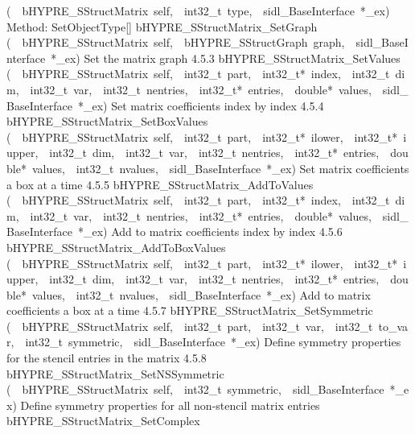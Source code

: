 \documentclass{article}
\begin{document}
\begin{cxxentry}
\begin{cxxentry}
\begin{cxxnames}
        {(\ \ bHYPRE\_SStructMatrix\ self,\ \ int32\_t\ type,\ \ sidl\_BaseInterface\ *\_ex)}
        {
Method:  SetObjectType[]}
        {}
\label{cxx.4.5.19}
        {bHYPRE\_SStructMatrix\_SetGraph}
        {(\ \ bHYPRE\_SStructMatrix\ self,\ \ bHYPRE\_SStructGraph\ graph,\ \ sidl\_BaseInterface\ *\_ex)}
        {
Set the matrix graph}
        {4.5.3}
        {bHYPRE\_SStructMatrix\_SetValues}
        {(\ \ bHYPRE\_SStructMatrix\ self,\ \ int32\_t\ part,\ \ int32\_t*\ index,\ \ int32\_t\ dim,\ \ int32\_t\ var,\ \ int32\_t\ nentries,\ \ int32\_t*\ entries,\ \ double*\ values,\ \ sidl\_BaseInterface\ *\_ex)}
        {
Set matrix coefficients index by index}
        {4.5.4}
        {bHYPRE\_SStructMatrix\_SetBoxValues}
        {(\ \ bHYPRE\_SStructMatrix\ self,\ \ int32\_t\ part,\ \ int32\_t*\ ilower,\ \ int32\_t*\ iupper,\ \ int32\_t\ dim,\ \ int32\_t\ var,\ \ int32\_t\ nentries,\ \ int32\_t*\ entries,\ \ double*\ values,\ \ int32\_t\ nvalues,\ \ sidl\_BaseInterface\ *\_ex)}
        {
Set matrix coefficients a box at a time}
        {4.5.5}
        {bHYPRE\_SStructMatrix\_AddToValues}
        {(\ \ bHYPRE\_SStructMatrix\ self,\ \ int32\_t\ part,\ \ int32\_t*\ index,\ \ int32\_t\ dim,\ \ int32\_t\ var,\ \ int32\_t\ nentries,\ \ int32\_t*\ entries,\ \ double*\ values,\ \ sidl\_BaseInterface\ *\_ex)}
        {
Add to matrix coefficients index by index}
        {4.5.6}
        {bHYPRE\_SStructMatrix\_AddToBoxValues}
        {(\ \ bHYPRE\_SStructMatrix\ self,\ \ int32\_t\ part,\ \ int32\_t*\ ilower,\ \ int32\_t*\ iupper,\ \ int32\_t\ dim,\ \ int32\_t\ var,\ \ int32\_t\ nentries,\ \ int32\_t*\ entries,\ \ double*\ values,\ \ int32\_t\ nvalues,\ \ sidl\_BaseInterface\ *\_ex)}
        {
Add to matrix coefficients a box at a time}
        {4.5.7}
        {bHYPRE\_SStructMatrix\_SetSymmetric}
        {(\ \ bHYPRE\_SStructMatrix\ self,\ \ int32\_t\ part,\ \ int32\_t\ var,\ \ int32\_t\ to\_var,\ \ int32\_t\ symmetric,\ \ sidl\_BaseInterface\ *\_ex)}
        {
Define symmetry properties for the stencil entries in the
matrix}
        {4.5.8}
        {bHYPRE\_SStructMatrix\_SetNSSymmetric}
        {(\ \ bHYPRE\_SStructMatrix\ self,\ \ int32\_t\ symmetric,\ \ sidl\_BaseInterface\ *\_ex)}
        {
Define symmetry properties for all non-stencil matrix
entries}
        {}
\label{cxx.4.5.20}
        {bHYPRE\_SStructMatrix\_SetComplex}

\end{cxxnames}
\end{cxxentry}
\end{cxxentry}
\end{document}
